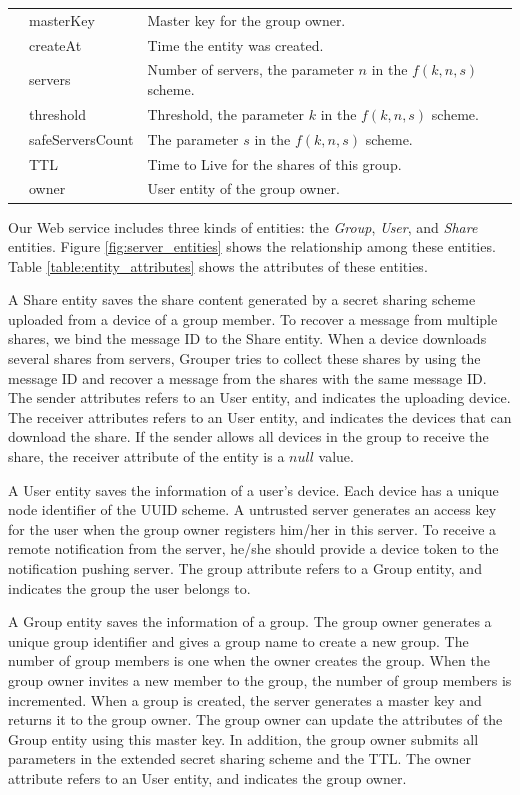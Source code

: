 \documentclass[a4paper,11pt]{report}
\begin{document}
\begin{table}[t]
\begin{tabular}{@{}lll@{}}
		& masterKey & Master key for the group owner. \\
		& createAt & Time the entity was created. \\
		& servers & Number of servers, the parameter $n$ in the $f(k, n, s)$ scheme. \\
		& threshold & Threshold, the parameter $k$ in the $f(k, n, s)$ scheme. \\
		& safeServersCount & The parameter $s$ in the $f(k, n, s)$ scheme.  \\
		& TTL & Time to Live for the shares of this group.  \\
		& owner & User entity of the group owner. \\ 
		\bottomrule
	\end{tabular}
\end{table}

Our Web service includes three kinds of entities: the \emph{Group}, \emph{User}, and \emph{Share} entities.
Figure \ref{fig:server_entities} shows the relationship among these entities.
Table \ref{table:entity_attributes} shows the attributes of these entities.

A Share entity saves the share content generated by a secret sharing scheme uploaded from a device of a group member.
To recover a message from multiple shares, we bind the message ID to the Share entity.
When a device downloads several shares from servers, Grouper tries to collect these shares by using the message ID and recover a message from the shares with the same message ID.
The sender attributes refers to an User entity, and indicates the uploading device.
The receiver attributes refers to an User entity, and indicates the devices that can download the share.
If the sender allows all devices in the group to receive the share, the receiver attribute of the entity is a $null$ value.

A User entity saves the information of a user's device.
Each device has a unique node identifier of the UUID scheme.
A untrusted server generates an access key for the user when the group owner registers him/her in this server.
To receive a remote notification from the server, he/she should provide a device token to the notification pushing server.
The group attribute refers to a Group entity, and indicates the group the user belongs to.

A Group entity saves the information of a group.
The group owner generates a unique group identifier and gives a group name to create a new group.
The number of group members is one when the owner creates the group.
When the group owner invites a new member to the group, the number of group members is incremented.
When a group is created, the server generates a master key and returns it to the group owner.
The group owner can update the attributes of the Group entity using this master key.
In addition, the group owner submits all parameters in the extended secret sharing scheme and the TTL.
The owner attribute refers to an User entity, and indicates the group owner.
\end{document}
